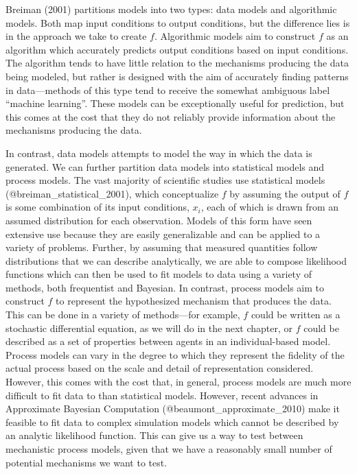 Breiman (2001) partitions models into two types: data models and
algorithmic models. Both map input conditions to output conditions, but
the difference lies is in the approach we take to create \(f\).
Algorithmic models aim to construct \(f\) as an algorithm which
accurately predicts output conditions based on input conditions. The
algorithm tends to have little relation to the mechanisms producing the
data being modeled, but rather is designed with the aim of accurately
finding patterns in data---methods of this type tend to receive the
somewhat ambiguous label ``machine learning''. These models can be
exceptionally useful for prediction, but this comes at the cost that
they do not reliably provide information about the mechanisms producing
the data.

In contrast, data models attempts to model the way in which the data is
generated. We can further partition data models into statistical models
and process models. The vast majority of scientific studies use
statistical models (@breiman\_statistical\_2001), which conceptualize
\(f\) by assuming the output of \(f\) is some combination of its input
conditions, \(x_i\), each of which is drawn from an assumed distribution
for each observation. Models of this form have seen extensive use
because they are easily generalizable and can be applied to a variety of
problems. Further, by assuming that measured quantities follow
distributions that we can describe analytically, we are able to compose
likelihood functions which can then be used to fit models to data using
a variety of methods, both frequentist and Bayesian. In contrast,
process models aim to construct \(f\) to represent the hypothesized
mechanism that produces the data. This can be done in a variety of
methods---for example, \(f\) could be written as a stochastic
differential equation, as we will do in the next chapter, or \(f\) could
be described as a set of properties between agents in an
individual-based model. Process models can vary in the degree to which
they represent the fidelity of the actual process based on the scale and
detail of representation considered. However, this comes with the cost
that, in general, process models are much more difficult to fit data to
than statistical models. However, recent advances in Approximate
Bayesian Computation (@beaumont\_approximate\_2010) make it feasible to
fit data to complex simulation models which cannot be described by an
analytic likelihood function. This can give us a way to test between
mechanistic process models, given that we have a reasonably small number
of potential mechanisms we want to test.

